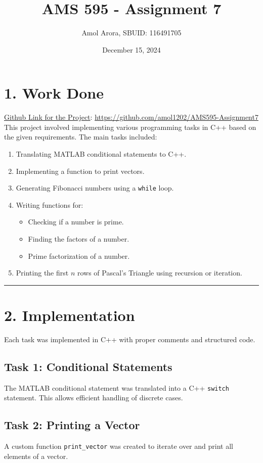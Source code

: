 \documentclass[12pt]{article}
\title{AMS 595 - Assignment 7}
\author{Amol Arora, SBUID: 116491705}
\date{December 15, 2024}
\begin{document}
\maketitle

\section*{1. Work Done}
\underline{Github Link for the Project}: \url{https://github.com/amol1202/AMS595-Assignment7} \\[8pt]
This project involved implementing various programming tasks in C++ based on the given requirements. The main tasks included:

\begin{enumerate}
    \item Translating MATLAB conditional statements to C++.
    \item Implementing a function to print vectors.
    \item Generating Fibonacci numbers using a \texttt{while} loop.
    \item Writing functions for:
    \begin{itemize}
        \item Checking if a number is prime.
        \item Finding the factors of a number.
        \item Prime factorization of a number.
    \end{itemize}
    \item Printing the first \(n\) rows of Pascal's Triangle using recursion or iteration.
\end{enumerate}
\hrule
\section*{2. Implementation}
Each task was implemented in C++ with proper comments and structured code.

\subsection*{Task 1: Conditional Statements}
The MATLAB conditional statement was translated into a C++ \texttt{switch} statement. This allows efficient handling of discrete cases.

\subsection*{Task 2: Printing a Vector}
A custom function \texttt{print\_vector} was created to iterate over and print all elements of a vector.
\end{document}
